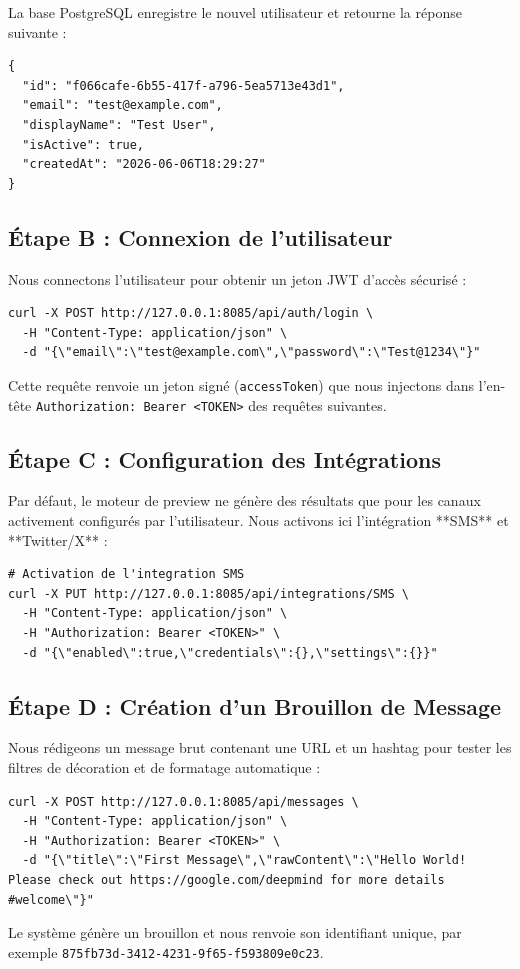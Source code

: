 La base PostgreSQL enregistre le nouvel utilisateur et retourne la réponse suivante :
\begin{lstlisting}[basicstyle=\footnotesize\ttfamily, frame=single]
{
  "id": "f066cafe-6b55-417f-a796-5ea5713e43d1",
  "email": "test@example.com",
  "displayName": "Test User",
  "isActive": true,
  "createdAt": "2026-06-06T18:29:27"
}
\end{lstlisting}

\subsection{Étape B : Connexion de l'utilisateur}
Nous connectons l'utilisateur pour obtenir un jeton JWT d'accès sécurisé :
\begin{lstlisting}[basicstyle=\footnotesize\ttfamily, frame=single]
curl -X POST http://127.0.0.1:8085/api/auth/login \
  -H "Content-Type: application/json" \
  -d "{\"email\":\"test@example.com\",\"password\":\"Test@1234\"}"
\end{lstlisting}
Cette requête renvoie un jeton signé (\texttt{accessToken}) que nous injectons dans l'en-tête \texttt{Authorization: Bearer <TOKEN>} des requêtes suivantes.

\subsection{Étape C : Configuration des Intégrations}
Par défaut, le moteur de preview ne génère des résultats que pour les canaux activement configurés par l'utilisateur. Nous activons ici l'intégration **SMS** et **Twitter/X** :
\begin{lstlisting}[basicstyle=\footnotesize\ttfamily, frame=single]
# Activation de l'integration SMS
curl -X PUT http://127.0.0.1:8085/api/integrations/SMS \
  -H "Content-Type: application/json" \
  -H "Authorization: Bearer <TOKEN>" \
  -d "{\"enabled\":true,\"credentials\":{},\"settings\":{}}"
\end{lstlisting}

\subsection{Étape D : Création d'un Brouillon de Message}
Nous rédigeons un message brut contenant une URL et un hashtag pour tester les filtres de décoration et de formatage automatique :
\begin{lstlisting}[basicstyle=\footnotesize\ttfamily, frame=single]
curl -X POST http://127.0.0.1:8085/api/messages \
  -H "Content-Type: application/json" \
  -H "Authorization: Bearer <TOKEN>" \
  -d "{\"title\":\"First Message\",\"rawContent\":\"Hello World! Please check out https://google.com/deepmind for more details #welcome\"}"
\end{lstlisting}
Le système génère un brouillon et nous renvoie son identifiant unique, par exemple \texttt{875fb73d-3412-4231-9f65-f593809e0c23}.

